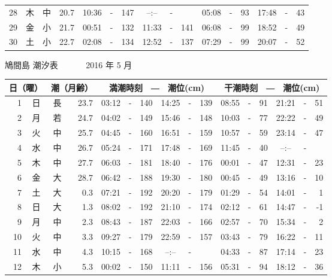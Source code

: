 \documentclass[12pt.a4j]{jsarticle}
\begin{document}
\begin{center}
\begin{table}[ht]
\begin{tabular}{|rc|cr|ccrccr|ccrccr|}
28 & 木 & 中 & 20.7 &  10:36 &-& 147  &  --:-- &-&     &   05:08 &-&  93  &   17:48 &-&  43  \\
29 & 金 & 小 & 21.7 &  00:51 &-& 132  &  11:33 &-& 141  &   06:08 &-&  99  &   18:52 &-&  49  \\
30 & 土 & 小 & 22.7 &  02:08 &-& 134  &  12:52 &-& 137  &   07:29 &-&  99  &   20:07 &-&  52  \\
   \hline
   \end{tabular}
\end{table}
\newpage
 {\LARGE 鳩間島  潮汐表　　　}
 {\large 2016 年  5 月}\\
 \begin{table}[ht]
    \begin{tabular}{|rc|cr|ccrccr|ccrccr|}
    \hline
    \multicolumn{2}{|c|}{日（曜）} & \multicolumn{2}{c|}{潮（月齢）} & \multicolumn{6}{c|}{満潮時刻　―　潮位(cm)} & \multicolumn{6}{c|}{干潮時刻　―　潮位(cm)} \\
 \hline
 1 & 日 & 長 & 23.7 &  03:12 &-& 140  &  14:25 &-& 139  &   08:55 &-&  91  &   21:21 &-&  51  \\
 2 & 月 & 若 & 24.7 &  04:02 &-& 149  &  15:46 &-& 148  &   10:03 &-&  77  &   22:22 &-&  49  \\
 3 & 火 & 中 & 25.7 &  04:45 &-& 160  &  16:51 &-& 159  &   10:57 &-&  59  &   23:14 &-&  47  \\
 4 & 水 & 中 & 26.7 &  05:24 &-& 171  &  17:48 &-& 169  &   11:45 &-&  40  &   --:-- &-&     \\
 5 & 木 & 中 & 27.7 &  06:03 &-& 181  &  18:40 &-& 176  &   00:01 &-&  47  &   12:31 &-&  23  \\
 6 & 金 & 大 & 28.7 &  06:42 &-& 188  &  19:30 &-& 180  &   00:45 &-&  49  &   13:16 &-&  10  \\
 7 & 土 & 大 &  0.3 &  07:21 &-& 192  &  20:20 &-& 179  &   01:29 &-&  54  &   14:01 &-&   1  \\
 8 & 日 & 大 &  1.3 &  08:02 &-& 192  &  21:10 &-& 174  &   02:12 &-&  61  &   14:47 &-&  -1  \\
 9 & 月 & 中 &  2.3 &  08:43 &-& 187  &  22:03 &-& 166  &   02:57 &-&  70  &   15:34 &-&   2  \\
10 & 火 & 中 &  3.3 &  09:27 &-& 179  &  22:59 &-& 157  &   03:43 &-&  79  &   16:22 &-&  11  \\
11 & 水 & 中 &  4.3 &  10:15 &-& 168  &  --:-- &-&     &   04:33 &-&  87  &   17:14 &-&  23  \\
12 & 木 & 小 &  5.3 &  00:02 &-& 150  &  11:11 &-& 156  &   05:31 &-&  94  &   18:12 &-&  36  \\

\end{tabular}
\end{table}
\end{center}
\end{document}
